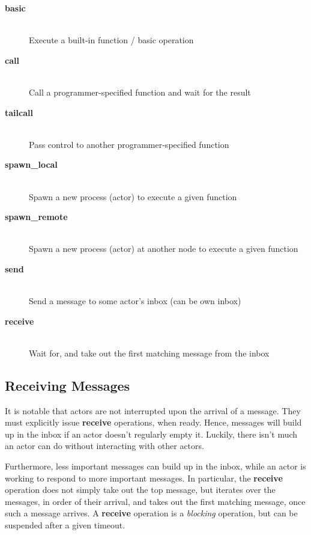 \begin{description}

\item[\textbf{basic}]\ \\ Execute a built-in function / basic
operation

\item[\textbf{call}]\ \\ Call a programmer-specified function and wait
for the result

\item[\textbf{tailcall}]\ \\ Pass control to another
programmer-specified function

\item[\textbf{spawn\_local}]\ \\ Spawn a new process (actor) to execute
a given function

\item[\textbf{spawn\_remote}]\ \\ Spawn a new process (actor) at
another node to execute a given function

\item[\textbf{send}]\ \\ Send a message to some actor's inbox (can be
own inbox)

\item[\textbf{receive}]\ \\ Wait for, and take out the first matching
message from the inbox

\end{description}

\subsection*{Receiving Messages}

It is notable that actors are not interrupted upon the arrival of a
message. They must explicitly issue \textbf{receive} operations, when
ready. Hence, messages will build up in the inbox if an actor doesn't
regularly empty it. Luckily, there isn't much an actor can do without
interacting with other actors.

Furthermore, less important messages can build up in the inbox, while
an actor is working to respond to more important messages. In
particular, the \textbf{receive} operation does not simply take out
the top message, but iterates over the messages, in order of their
arrival, and takes out the first matching message, once such a message
arrives. A \textbf{receive} operation is a \emph{blocking} operation,
but can be suspended after a given timeout.

